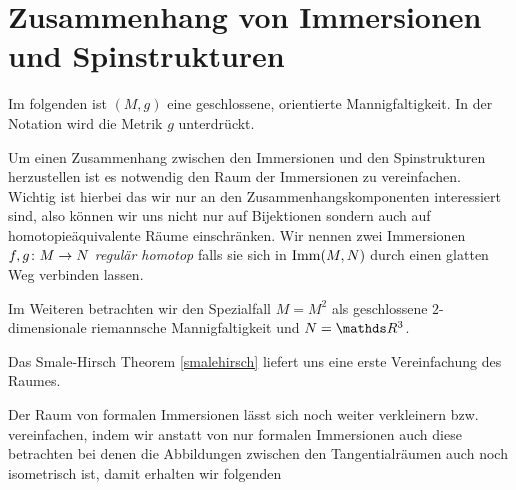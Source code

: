 


\section{Zusammenhang von Immersionen und Spinstrukturen}
\label{sec:Zusammenhang von Immersionen und Spinstrukturen}

Im folgenden ist $(M,g)$ eine geschlossene, orientierte Mannigfaltigkeit.
In der Notation wird die Metrik $g$ unterdrückt.


Um einen Zusammenhang zwischen den Immersionen und den Spinstrukturen
herzustellen ist es notwendig den Raum der Immersionen zu
vereinfachen.  Wichtig ist hierbei das wir nur an den
Zusammenhangskomponenten interessiert sind, also können wir uns nicht
nur auf Bijektionen sondern auch auf homotopieäquivalente Räume
einschränken.  Wir nennen zwei Immersionen $ f,g \colon M \rightarrow N $
\textit{regulär homotop} falls sie sich in $ \operatorname{Imm}(M,N) $ durch einen
glatten Weg verbinden lassen.

Im Weiteren betrachten wir den Spezialfall $ M=M^2 $ als geschlossene $ 2 $-dimensionale riemannsche Mannigfaltigkeit und
$ N=\R^3 $.

Das Smale-Hirsch Theorem \cref{smalehirsch} liefert uns eine erste Vereinfachung des Raumes. 

Der Raum von formalen Immersionen lässt sich noch weiter verkleinern
bzw. vereinfachen, indem wir anstatt von nur formalen Immersionen auch
diese betrachten bei denen die Abbildungen zwischen den
Tangentialräumen auch noch isometrisch ist, damit erhalten wir
folgenden


